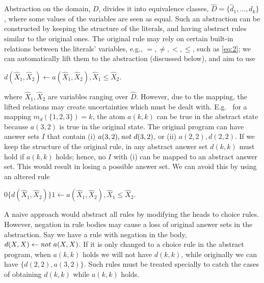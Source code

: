 \documentclass{new_tlp}
\newcommand{\nqbls}{\vspace*{-0.25\baselineskip}}
\newcommand{\nhbls}{\vspace*{-0.5\baselineskip}}
\def\mi#1{\mathit{#1\/}}
\begin{document}
Abstraction on the domain, $D$, divides it into equivalence classes, $\widehat{D}=\{\hat{d}_1,\dots,\hat{d}_k\}$, where some values of the variables are seen as equal. 
Such an abstraction can be constructed by keeping the structure of the
literals, and having abstract rules similar to the original ones. The
original rule may rely on certain built-in relations between the
literals' variables, e.g., $=,\neq,<,\leq$, such as \eqref{eq:2};
we can automatically lift 
them to the abstraction
(discussed below), and 
aim to use
\smallskip

\centerline{$d(\widehat{X}_1,\widehat{X}_2) \leftarrow a(\widehat{X}_1,\widehat{X}_2), \widehat{X}_1{\leq}\widehat{X}_2.$}

\smallskip

\noindent where $\widehat{X}_1,\widehat{X}_2$ are variables ranging over $\widehat{D}$.
However, due to the mapping, the lifted relations may create
uncertainties which must be dealt with. 
E.g.\
for a mapping $m_d(\{1,2,3\})=k$, the atom $a(k,k)$ can be true in
the abstract state because $a(3,2)$ is true in the
original state. 
 The original program can have answer sets $I$ that contain (i) $a(3,2),\mi{not}\ d(3,2)$, or (ii) $a(2,2),d(2,2)$. If we keep the structure of the original rule, in any abstract answer set $d(k,k)$ must hold if $a(k,k)$ holds; hence, no $I$ with (i) can be mapped to an abstract answer set. This would result in losing a possible answer set. 
We can avoid this
by using an altered rule
\smallskip

\centerline{$0\{d(\widehat{X}_1,\widehat{X}_2)\}1 \leftarrow a(\widehat{X}_1,\widehat{X}_2), \widehat{X}_1{\leq}\widehat{X}_2.$}

\smallskip

A naive approach would 
abstract all rules by modifying the heads
to choice rules. However, %
negation in rule bodies may cause
a loss of
original answer sets in the abstraction. Say we have a rule with negation in the body, $d(X,X) \leftarrow \mi{not}\ a(X,X)$. If it is only changed to a choice rule in the abstract program, when $a(k,k)$ holds we will not have $d(k,k)$, while originally we can have $\{d(2,2),a(3,2)\}$. Such rules must be treated specially to catch the cases of obtaining $d(k,k)$ while $a(k,k)$ holds.
\end{document}
